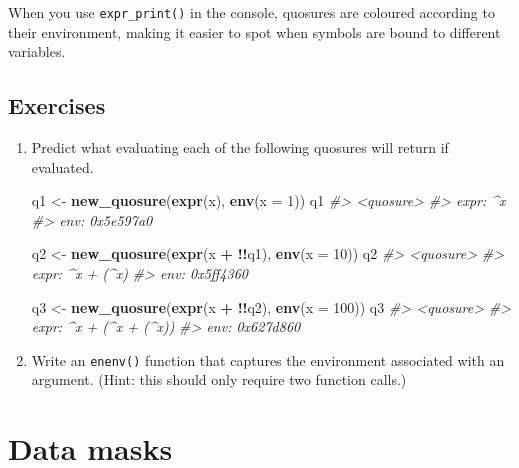 \documentclass[]{book}
\newenvironment{Shaded}{\begin{snugshade}}{\end{snugshade}}
\newcommand{\CommentTok}[1]{\textcolor[rgb]{0.37,0.37,0.37}{\textit{#1}}}
\newcommand{\DataTypeTok}[1]{\textcolor[rgb]{0.27,0.27,0.27}{#1}}
\newcommand{\DecValTok}[1]{\textcolor[rgb]{0.06,0.06,0.06}{#1}}
\newcommand{\KeywordTok}[1]{\textcolor[rgb]{0.27,0.27,0.27}{\textbf{#1}}}
\newcommand{\NormalTok}[1]{#1}
\newcommand{\OperatorTok}[1]{\textcolor[rgb]{0.43,0.43,0.43}{\textbf{#1}}}
\newcommand{\StringTok}[1]{\textcolor[rgb]{0.5,0.5,0.5}{#1}}
\begin{document}
When you use \texttt{expr\_print()} in the console, quosures are coloured according to their environment, making it easier to spot when symbols are bound to different variables.

\hypertarget{exercises-10}{%
\subsection{Exercises}\label{exercises-10}}

\begin{enumerate}
\def\labelenumi{\arabic{enumi}.}
\item
  Predict what evaluating each of the following quosures will return if
  evaluated.

\begin{Shaded}
\begin{Highlighting}[]
\NormalTok{q1 <-}\StringTok{ }\KeywordTok{new_quosure}\NormalTok{(}\KeywordTok{expr}\NormalTok{(x), }\KeywordTok{env}\NormalTok{(}\DataTypeTok{x =} \DecValTok{1}\NormalTok{))}
\NormalTok{q1}
\CommentTok{#> <quosure>}
\CommentTok{#> expr: ^x}
\CommentTok{#> env:  0x5e597a0}

\NormalTok{q2 <-}\StringTok{ }\KeywordTok{new_quosure}\NormalTok{(}\KeywordTok{expr}\NormalTok{(x }\OperatorTok{+}\StringTok{ }\OperatorTok{!!}\NormalTok{q1), }\KeywordTok{env}\NormalTok{(}\DataTypeTok{x =} \DecValTok{10}\NormalTok{))}
\NormalTok{q2}
\CommentTok{#> <quosure>}
\CommentTok{#> expr: ^x + (^x)}
\CommentTok{#> env:  0x5ff4360}

\NormalTok{q3 <-}\StringTok{ }\KeywordTok{new_quosure}\NormalTok{(}\KeywordTok{expr}\NormalTok{(x }\OperatorTok{+}\StringTok{ }\OperatorTok{!!}\NormalTok{q2), }\KeywordTok{env}\NormalTok{(}\DataTypeTok{x =} \DecValTok{100}\NormalTok{))}
\NormalTok{q3}
\CommentTok{#> <quosure>}
\CommentTok{#> expr: ^x + (^x + (^x))}
\CommentTok{#> env:  0x627d860}
\end{Highlighting}
\end{Shaded}
\item
  Write an \texttt{enenv()} function that captures the environment associated
  with an argument. (Hint: this should only require two function calls.)
\end{enumerate}

\hypertarget{data-masks}{%
\section{Data masks}\label{data-masks}}

\end{document}
